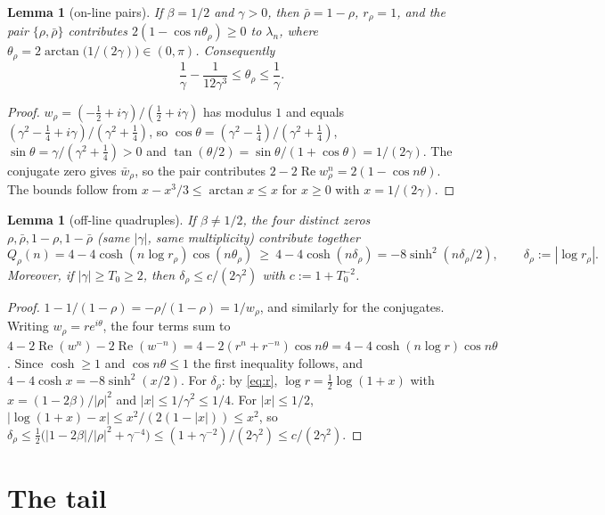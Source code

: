 \documentclass[11pt]{article}
\newtheorem{lemma}[theorem]{Lemma}
\theoremstyle{remark}
\renewcommand{\Re}{\operatorname{Re}}
\begin{document}
\begin{lemma}[on-line pairs]\label{lem:online}
If $\beta=1/2$ and $\gamma>0$, then $\bar\rho=1-\rho$, $r_\rho=1$, and the pair $\{\rho,\bar\rho\}$ contributes $2(1-\cos n\theta_\rho)\ge0$ to $\lambda_n$, where $\theta_\rho=2\arctan\bigl(1/(2\gamma)\bigr)\in(0,\pi)$. Consequently
\[
\frac1\gamma-\frac1{12\gamma^3}\le\theta_\rho\le\frac1\gamma .
\]
\end{lemma}
\begin{proof}
$w_\rho=(-\tfrac12+i\gamma)/(\tfrac12+i\gamma)$ has modulus $1$ and equals $(\gamma^2-\tfrac14+i\gamma)/(\gamma^2+\tfrac14)$, so $\cos\theta=(\gamma^2-\tfrac14)/(\gamma^2+\tfrac14)$, $\sin\theta=\gamma/(\gamma^2+\tfrac14)>0$ and $\tan(\theta/2)=\sin\theta/(1+\cos\theta)=1/(2\gamma)$. The conjugate zero gives $\bar w_\rho$, so the pair contributes $2-2\Re w_\rho^n=2(1-\cos n\theta)$. The bounds follow from $x-x^3/3\le\arctan x\le x$ for $x\ge0$ with $x=1/(2\gamma)$.
\end{proof}

\begin{lemma}[off-line quadruples]\label{lem:offline}
If $\beta\ne1/2$, the four distinct zeros $\rho,\bar\rho,1-\rho,1-\bar\rho$ (same $|\gamma|$, same multiplicity) contribute together
\[
Q_\rho(n)=4-4\cosh(n\log r_\rho)\cos(n\theta_\rho)\ \ge\ 4-4\cosh(n\delta_\rho)=-8\sinh^2(n\delta_\rho/2),\qquad \delta_\rho:=|\log r_\rho| .
\]
Moreover, if $|\gamma|\ge T_0\ge2$, then $\delta_\rho\le c/(2\gamma^2)$ with $c:=1+T_0^{-2}$.
\end{lemma}
\begin{proof}
$1-1/(1-\rho)=-\rho/(1-\rho)=1/w_\rho$, and similarly for the conjugates. Writing $w_\rho=re^{i\theta}$, the four terms sum to $4-2\Re(w^n)-2\Re(w^{-n})=4-2(r^n+r^{-n})\cos n\theta=4-4\cosh(n\log r)\cos n\theta$. Since $\cosh\ge1$ and $\cos n\theta\le1$ the first inequality follows, and $4-4\cosh x=-8\sinh^2(x/2)$. For $\delta_\rho$: by \eqref{eq:r}, $\log r=\tfrac12\log(1+x)$ with $x=(1-2\beta)/|\rho|^2$ and $|x|\le1/\gamma^2\le1/4$. For $|x|\le1/2$, $|\log(1+x)-x|\le x^2/(2(1-|x|))\le x^2$, so $\delta_\rho\le\tfrac12\bigl(|1-2\beta|/|\rho|^2+\gamma^{-4}\bigr)\le(1+\gamma^{-2})/(2\gamma^2)\le c/(2\gamma^2)$.
\end{proof}

\section{The tail}
\end{document}
